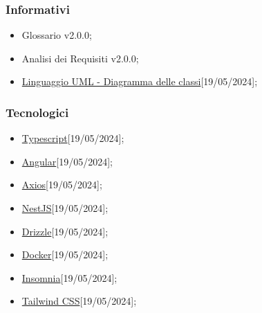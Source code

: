 \subsubsection{Informativi}
\begin{itemize}
	\item Glossario v2.0.0;
	\item Analisi dei Requisiti v2.0.0;
	\item \href{https://www.math.unipd.it/~rcardin/swea/2023/Diagrammi\%20delle\%20Classi.pdf}
		{Linguaggio UML - Diagramma delle classi}[19/05/2024];
\end{itemize}

\subsubsection{Tecnologici}
\begin{itemize}
	\item \href{https://www.typescriptlang.org/}
		{Typescript}[19/05/2024];

	\item \href{https://angular.io/}
		{Angular}[19/05/2024];

	\item \href{https://axios-http.com/}
		{Axios}[19/05/2024];

	\item \href{https://nestjs.com/}
		{NestJS}[19/05/2024];

	\item \href{https://orm.drizzle.team/}
		{Drizzle}[19/05/2024];

	\item \href{https://www.docker.com/}
		{Docker}[19/05/2024];

	\item \href{https://insomnia.rest/}
		{Insomnia}[19/05/2024];

	\item \href{https://tailwindcss.com/}
		{Tailwind CSS}[19/05/2024];
\end{itemize}

